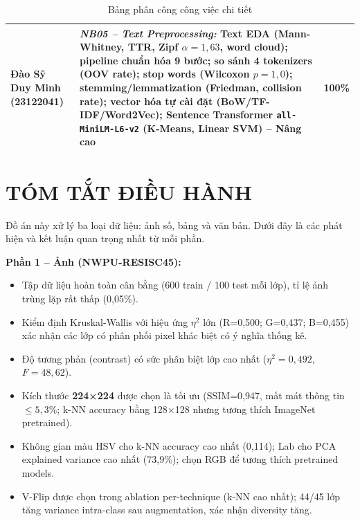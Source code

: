 \documentclass[12pt,a4paper]{article}
\let\oldtextbf\textbf
\renewcommand{\textbf}[1]{\oldtextbf{\textcolor{hcmublue}{#1}}}
\begin{document}
\begin{table}[H]
{\begin{tabular}{|l|p{13cm}|c|}
\textbf{Đào Sỹ Duy Minh} \newline (23122041) &
\textit{NB05 -- Text Preprocessing:} Text EDA (Mann-Whitney, TTR, Zipf $\alpha=1{,}63$, word cloud); pipeline chuẩn hóa 9 bước; so sánh 4 tokenizers (OOV rate); stop words (Wilcoxon $p=1{,}0$); stemming/lemmatization (Friedman, collision rate); vector hóa tự cài đặt (BoW/TF-IDF/Word2Vec); Sentence Transformer \texttt{all-MiniLM-L6-v2} (K-Means, Linear SVM) -- Nâng cao
& 100\% \\ \hline

\end{tabular}%
}
\caption{Bảng phân công công việc chi tiết}
\label{tab:work_distribution}
\end{table}

\section{TÓM TẮT ĐIỀU HÀNH}

Đồ án này xử lý ba loại dữ liệu: ảnh số, bảng và văn bản. Dưới đây là các phát hiện và kết luận quan trọng nhất từ mỗi phần.

\textbf{Phần 1 -- Ảnh (NWPU-RESISC45):}
\begin{itemize}
    \item Tập dữ liệu hoàn toàn cân bằng (600 train / 100 test mỗi lớp), tỉ lệ ảnh trùng lặp rất thấp (0,05\%).
    \item Kiểm định Kruskal-Wallis với hiệu ứng $\eta^2$ lớn (R=0,500; G=0,437; B=0,455) xác nhận các lớp có phân phối pixel khác biệt có ý nghĩa thống kê.
    \item Độ tương phản (contrast) có sức phân biệt lớp cao nhất ($\eta^2 = 0{,}492$, $F = 48{,}62$).
    \item Kích thước \textbf{224×224} được chọn là tối ưu (SSIM=0{,}947, mất mát thông tin $\leq 5{,}3\%$; k-NN accuracy bằng 128×128 nhưng tương thích ImageNet pretrained).
    \item Không gian màu HSV cho k-NN accuracy cao nhất (0{,}114); Lab cho PCA explained variance cao nhất (73{,}9\%); chọn RGB để tương thích pretrained models.
    \item V-Flip được chọn trong ablation per-technique (k-NN cao nhất); 44/45 lớp tăng variance intra-class sau augmentation, xác nhận diversity tăng.
\end{itemize}
\end{document}
